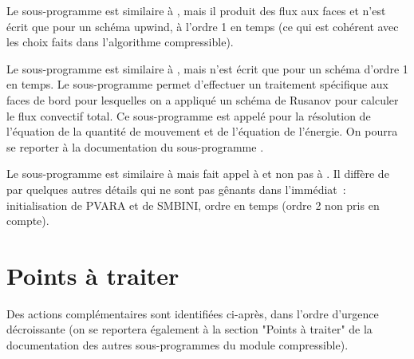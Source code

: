 
Le sous-programme  est similaire \`a , mais il produit
des flux aux faces et n'est \'ecrit que pour un sch\'ema upwind, \`a l'ordre 1
en temps (ce qui est coh\'erent avec les choix faits dans l'algorithme compressible).

Le sous-programme  est similaire \`a , mais
n'est \'ecrit que pour un sch\'ema d'ordre 1 en
temps.
Le sous-programme  permet d'effectuer un traitement
sp\'ecifique aux faces de bord pour lesquelles on a appliqu\'e
un sch\'ema de Rusanov pour calculer le flux convectif total.
Ce sous-programme est appel\'e pour la r\'esolution de l'\'equation de
la quantit\'e de mouvement et de l'\'equation de l'\'energie.
On pourra se reporter \`a la documentation du sous-programme .

Le sous-programme  est similaire \`a  mais fait appel
\`a  et non pas \`a .
Il diff\`ere de  par quelques autres d\'etails qui ne sont pas
g\^enants dans l'imm\'ediat~:
initialisation de PVARA et de SMBINI,
ordre en temps (ordre 2 non pris en compte).

\newpage
\section*{Points \`a traiter}

Des actions compl\'ementaires sont identifi\'ees ci-apr\`es, dans l'ordre
d'urgence d\'ecroissante (on se reportera
\'egalement \`a la section "Points \`a traiter" de la documentation
des autres sous-programmes du module compressible).


